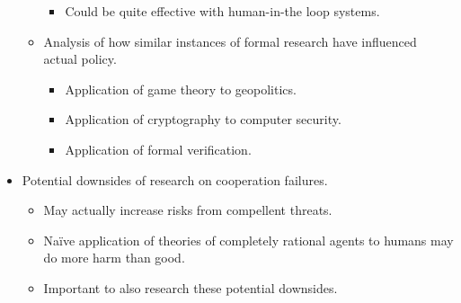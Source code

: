\begin{itemize}
\begin{itemize}
\begin{itemize}
            \item Could be quite effective with human-in-the loop systems.
        \end{itemize}
        \item Analysis of how similar instances of formal research have influenced actual policy.
        \begin{itemize}
            \item Application of game theory to geopolitics.
            \item Application of cryptography to computer security.
            \item Application of formal verification.
        \end{itemize}
    \end{itemize}
    \item Potential downsides of research on cooperation failures.
    \begin{itemize}
        \item May actually increase risks from compellent threats.
        \item Naïve application of theories of completely rational agents to humans may do more harm than good.
        \item Important to also research these potential downsides.
    \end{itemize}
\end{itemize}